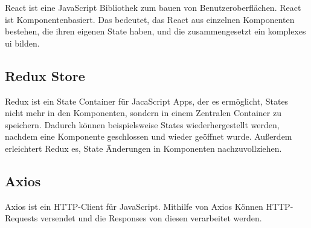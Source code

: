 React ist eine JavaScript Bibliothek zum bauen von Benutzeroberflächen.
React ist Komponentenbasiert.
Das bedeutet, das React aus einzelnen Komponenten bestehen, die ihren eigenen State haben, und die zusammengesetzt ein komplexes \ac{ui} bilden.
~\autocite{banks:react}


\subsection{Redux Store}
\label{sub:redux}

Redux ist ein State Container für JacaScript Apps, der es ermöglicht, States nicht mehr in den Komponenten, sondern in einem Zentralen Container zu speichern.
Dadurch können beispielsweise States wiederhergestellt werden, nachdem eine Komponente geschlossen und wieder geöffnet wurde.
Außerdem erleichtert Redux es, State Änderungen in Komponenten nachzuvollziehen.
~\autocite{freecodecamp:redux}

\subsection{Axios}
\label{sub:axios}

Axios ist ein HTTP-Client für JavaScript.
Mithilfe von Axios Können HTTP-Requests versendet und die Responses von diesen verarbeitet werden.
